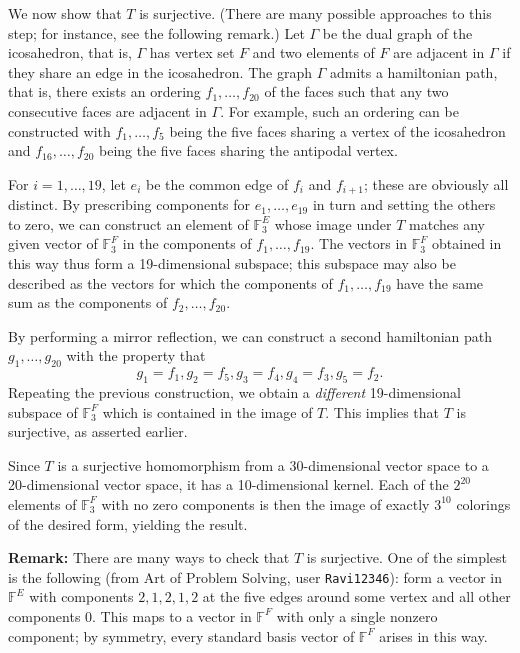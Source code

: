 \documentclass[amssymb,twocolumn,pra,10pt,aps]{revtex4-1}
\begin{document}
\begin{itemize}
We now show that $T$ is surjective. (There are many possible approaches to this step; for instance, see the following remark.) 
Let $\Gamma$ be the dual graph of the icosahedron, that is, $\Gamma$ has vertex set $F$ and two elements of $F$ are adjacent in $\Gamma$ if they share an edge in the icosahedron. The graph $\Gamma$ admits a hamiltonian path, that is, there exists an ordering
$f_1,\dots,f_{20}$ of the faces such that any two consecutive faces are adjacent in $\Gamma$. 
For example, such an ordering can be constructed with $f_1,\dots,f_5$ being the five faces sharing a vertex of the icosahedron and $f_{16},\dots,f_{20}$ being the five faces sharing the antipodal vertex.

For $i=1,\dots,19$, let $e_i$ be the common edge of $f_i$ and $f_{i+1}$; these are obviously all distinct.
By prescribing components for $e_1,\dots,e_{19}$ in turn and setting the others to zero,
we can construct an element of $\mathbb{F}_3^E$ whose image under $T$ matches any given vector of $\mathbb{F}_3^F$ in the components of $f_1,\dots,f_{19}$. The vectors in $\mathbb{F}_3^F$ obtained in this way thus form a 19-dimensional subspace; this subspace may also be described as the vectors for which the components of $f_1,\dots,f_{19}$ have the same sum as the components of $f_{2},\dots,f_{20}$. 

By performing a mirror reflection, we can construct a second hamiltonian path $g_1,\dots,g_{20}$ with the property that
\[
g_1 = f_1, g_2 = f_5, g_3 = f_4, g_4 = f_3, g_5 = f_2.
\]
Repeating the previous construction, we obtain a \emph{different} 19-dimensional subspace of $\mathbb{F}_3^F$ which is contained in the image of $T$. This implies that $T$ is surjective, as asserted earlier.

Since $T$ is a surjective homomorphism from a 30-dimensional vector space to a 20-dimensional vector space, it has a 10-dimensional kernel. Each of the $2^{20}$ elements of $\mathbb{F}_3^F$ with no zero components is then the image of exactly $3^{10}$ colorings of the desired form, yielding the result.

\noindent
\textbf{Remark:}
There are many ways to check that $T$ is surjective. One of the simplest is the following
(from Art of Problem Solving, user \texttt{Ravi12346}): form a vector in $\mathbb{F}^E$ with components $2,1,2,1,2$ at the five edges around some vertex and all other components 0. This maps to a vector in $\mathbb{F}^F$ with only a single nonzero component; by symmetry, every standard basis vector of $\mathbb{F}^F$ arises in this way.


\end{itemize}
\end{document}
